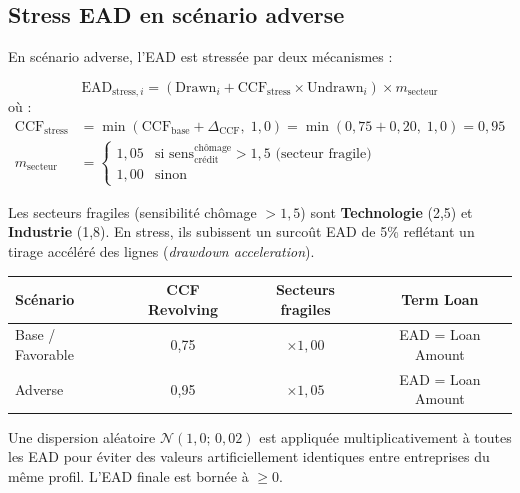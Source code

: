 \documentclass[12pt,a4paper]{article}
\begin{document}
\subsection{Stress EAD en sc\'enario adverse}

En sc\'enario adverse, l'EAD est stress\'ee par deux m\'ecanismes :

\begin{formulebox}
\begin{equation}
\label{eq:ead_stress}
\text{EAD}_{\text{stress},i} = \left(\text{Drawn}_i + \text{CCF}_{\text{stress}} \times \text{Undrawn}_i\right) \times m_{\text{secteur}}
\end{equation}
o\`u :
\begin{align}
\text{CCF}_{\text{stress}} &= \min\!\left(\text{CCF}_{\text{base}} + \Delta_{\text{CCF}},\; 1{,}0\right) = \min(0{,}75 + 0{,}20,\; 1{,}0) = 0{,}95 \\[4pt]
m_{\text{secteur}} &= \begin{cases}
1{,}05 & \text{si } \text{sens}^{\text{ch\^omage}}_{\text{cr\'edit}} > 1{,}5 \text{ (secteur fragile)} \\
1{,}00 & \text{sinon}
\end{cases}
\end{align}
\end{formulebox}

Les secteurs fragiles (sensibilit\'e ch\^omage $> 1{,}5$) sont \textbf{Technologie} (2,5) et \textbf{Industrie} (1,8). En stress, ils subissent un surco\^ut EAD de 5\% refl\'etant un tirage acc\'el\'er\'e des lignes (\textit{drawdown acceleration}).

\begin{center}
\begin{tabular}{lccc}
\toprule
\textbf{Sc\'enario} & \textbf{CCF Revolving} & \textbf{Secteurs fragiles} & \textbf{Term Loan} \\
\midrule
Base / Favorable & 0,75 & $\times 1{,}00$ & EAD = Loan Amount \\
Adverse          & 0,95 & $\times 1{,}05$ & EAD = Loan Amount \\
\bottomrule
\end{tabular}
\end{center}

\begin{warningbox}
Une dispersion al\'eatoire $\mathcal{N}(1{,}0;\, 0{,}02)$ est appliqu\'ee multiplicativement \`a toutes les EAD pour \'eviter des valeurs artificiellement identiques entre entreprises du m\^eme profil. L'EAD finale est born\'ee \`a $\geq 0$.
\end{warningbox}
\end{document}

